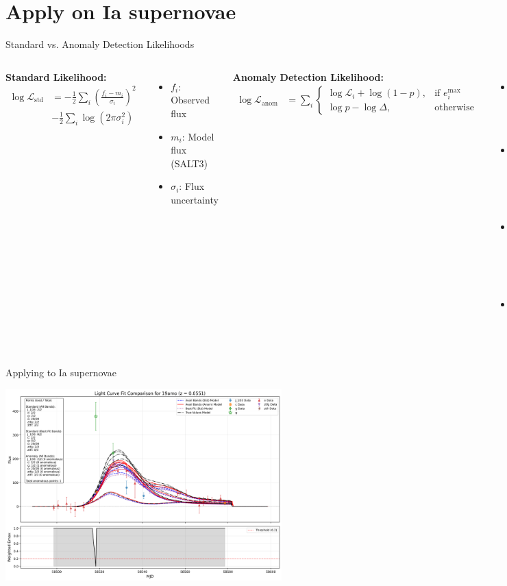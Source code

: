 \documentclass[aspectratio=169]{beamer}
\begin{document}
\section{Apply on Ia supernovae}

\begin{frame}{Standard vs. Anomaly Detection Likelihoods}
  \begin{columns}
    \textbf{Standard Likelihood:}
    \begin{align}
      \log \mathcal{L}_{\text{std}} &= -\frac{1}{2}\sum_i \left(\frac{f_i - m_i}{\sigma_i}\right)^2 \nonumber \\
      &- \frac{1}{2}\sum_i \log(2\pi\sigma_i^2)
    \end{align}
    \begin{itemize}
      \item $f_i$: Observed flux
      \item $m_i$: Model flux (SALT3)
      \item $\sigma_i$: Flux uncertainty
    \end{itemize}
    
    \textbf{Anomaly Detection Likelihood:}
    \begin{align}
      \log \mathcal{L}_{\text{anom}} &= \sum_i \begin{cases}
        \log \mathcal{L}_i + \log(1-p), & \text{if } e_i^{\max} \\
        \log p - \log \Delta, & \text{otherwise}
      \end{cases}
    \end{align}
    \begin{itemize}
      \item $\log \mathcal{L}_i$: Point-wise standard likelihood
      \item $p$: Anomaly probability (fitted parameter)
      \item $e_i^{\max}$: Boolean indicating normal data
      \item $\Delta$: Maximum flux range
    \end{itemize}
  \end{columns}
  
\end{frame}
\begin{frame}{Applying to Ia supernovae}
\begin{center}
  \includegraphics[width=0.8\textwidth]{images/light_curve_comparison_19amo.png}
\end{center}
\end{frame}
\end{document}
